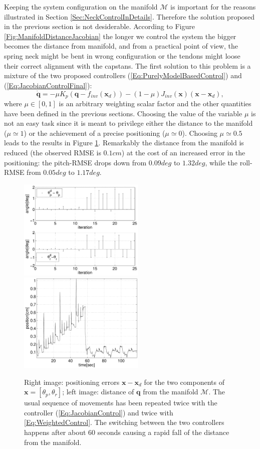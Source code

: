 \documentclass[conference]{IEEEtran}
\numberwithin{equation}{section}
\newcommand{\q}{\mathbf{q}}
\newcommand{\x}{\mathbf{x}}
\begin{document}
Keeping the system configuration on the manifold $\mathcal M$ is important for the reasons illustrated in Section \ref{Sec:NeckControlInDetails}. Therefore the solution proposed in the previous section is not desiderable. According to Figure 
\ref{Fig:ManifoldDistanceJacobian} the longer we control the system the bigger becomes the distance from manifold, and from a practical point of view, the spring neck might be bent in wrong configuration or the tendons might loose their correct alignment with the capstans. The first solution to this problem is a mixture of the two proposed controllers (\ref{Eq:PurelyModelBasedControl}) and (\ref{Eq:JacobianControlFinal}):
\begin{equation} \label{Eq:WeightedControl}
\dot{\q} = -\mu K_p(\q - f_{inv}(\x_d)) - (1-\mu) J_{inv}(\x) (\x - \x_d),
\end{equation}
where $\mu \in [0, 1]$ is an arbitrary weighting scalar factor and the other quantities have been defined in the previous sections. Choosing the value of the variable $\mu$ is not an easy task since it is meant to privilege either the distance to the manifold ($\mu \simeq 1$) or the achievement of a precise positioning ($\mu \simeq 0$). Choosing $\mu \simeq 0.5$ leads to the results in Figure \ref{Fig:ManifoldDistanceJacobianAndCompromise}. Remarkably the distance from the manifold is reduced (the observed RMSE is $0.1cm$) at the cost of an increased error in the positioning: the pitch-RMSE drops down from $0.09deg$ to $1.32deg$, while the roll-RMSE from $0.05deg$ to $1.17deg$.

\begin{figure}[tbp]
\centering 
\includegraphics[width=60mm]{image/ErrorsJacobianAndComprormise.pdf} 
\includegraphics[width=60mm]{image/ManifoldDistanceJacobianAndComprormise.pdf} 
\caption{Right image: positioning errors $\x - \x_d$ for the two components of $\x = [\theta_p, \theta_r]$; left image: distance of $\q$ from the manifold $\mathcal M$. The usual sequence of movements has been repeated twice with the controller (\ref{Eq:JacobianControl}) and twice with \eqref{Eq:WeightedControl}. The switching between the two controllers happens after about 60 seconds causing a rapid fall of the distance from the manifold.} 
\label{Fig:ManifoldDistanceJacobianAndCompromise}
\end{figure}
\end{document}

